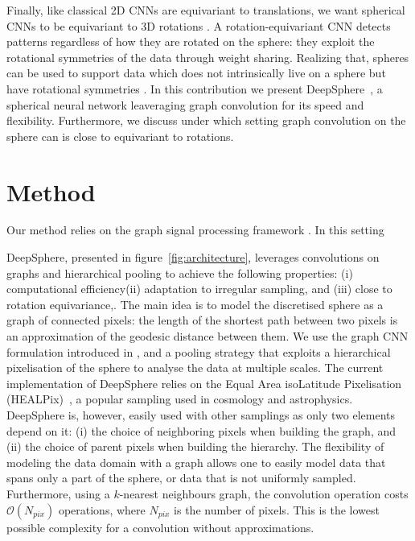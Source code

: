 \documentclass{article} %
\newcommand{\figref}[1]{figure~\ref{fig:#1}}
\newcommand{\1}{\b{1}}              %
\newcommand{\0}{\b{0}}              %
\newcommand{\todo}[1]{{\color[rgb]{.6,.1,.6}{#1}}}
\begin{document}
Finally, like classical 2D CNNs are equivariant to translations, we want spherical CNNs to be equivariant to 3D rotations \citep{cohen2016equivariance, kondor2018equivariance}.
A rotation-equivariant CNN detects patterns regardless of how they are rotated on the sphere: they exploit the rotational symmetries of the data through weight sharing.
Realizing that, spheres can be used to support data which does not intrinsically live on a sphere but have rotational symmetries \citep[for 3D objects and molecules]{cohen2018sphericalcnn, esteves2017sphericalcnn}.
In this contribution we present DeepSphere~\cite{perraudin2018deepsphere}, a spherical neural network leaveraging graph convolution for its speed and flexibility. Furthermore, we discuss under which setting graph convolution on the sphere can is close to equivariant to rotations.



\section{Method}

Our method relies on the graph signal processing framework \cite{shuman2013gsp}. In this setting  


DeepSphere, presented in \figref{architecture}, leverages convolutions on graphs and hierarchical pooling to achieve the following properties: (i) computational efficiency(ii) adaptation to irregular sampling, and (iii) close to rotation equivariance,.
The main idea is to model the discretised sphere as a graph of connected pixels: the length of the shortest path between two pixels is an approximation of the geodesic distance between them.
We use the graph CNN formulation introduced in \citep{defferrard2016convolutional}, and a pooling strategy that exploits a hierarchical pixelisation of the sphere to analyse the data at multiple scales.
The current implementation of DeepSphere relies on the Equal Area isoLatitude Pixelisation (HEALPix)~\citep{gorski2005healpix}, a popular sampling used in cosmology and astrophysics.
DeepSphere is, however, easily used with other samplings as only two elements depend on it: (i) the choice of neighboring pixels when building the graph, and (ii) the choice of parent pixels when building the hierarchy.
The flexibility of modeling the data domain with a graph allows one to easily model data that spans only a part of the sphere, or data that is not uniformly sampled. 
Furthermore, using a $k$-nearest neighbours graph, the convolution operation costs $\mathcal{O}(N_{pix})$ operations, where $N_{pix}$ is the number of pixels.
This is the lowest possible complexity for a convolution without approximations.
\end{document}
